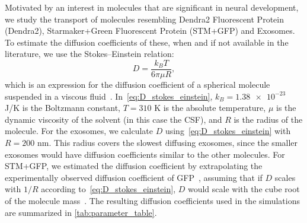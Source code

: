 \documentclass[fleqn]{wlscirep}
\begin{document}
Motivated by an interest in molecules that are significant in neural development, we study the transport of molecules resembling Dendra2 Fluorescent Protein (Dendra2), Starmaker+Green Fluorescent Protein (STM+GFP) and Exosomes. To estimate the diffusion coefficients of these, when and if not available in the literature, we use the Stokes--Einstein relation:
\begin{equation}
    D = \frac{k_B T}{6\pi \mu R} ,
    \label{eq:D_stokes_einstein}
\end{equation}
which is an expression for the diffusion coefficient of a spherical molecule suspended in a viscous fluid~\cite{Einstein1905UberTeilchen}. In~\eqref{eq:D_stokes_einstein}, $k_B = \num{1.38e-23}$ J/K is the Boltzmann constant, $T = 310$ K is the absolute temperature, $\mu$ is the dynamic viscosity of the solvent (in this case the CSF), and $R$ is the radius of the molecule. For the exosomes, we calculate $D$ using~\eqref{eq:D_stokes_einstein} with $R=200$ nm. This radius covers the slowest diffusing exosomes, since the smaller exosomes would have diffusion coefficients similar to the other molecules. For STM+GFP, we estimated the diffusion coefficient by extrapolating the experimentally observed diffusion coefficient of GFP~\cite{Swaminathan1997PhotobleachingDiffusion, Potma2001ReducedCells}, assuming that if $D$ scales with $1/R$ according to~\eqref{eq:D_stokes_einstein}, $D$ would scale with the cube root of the molecule mass~\cite{Goodhill1997DiffusionGuidance}. The resulting diffusion coefficients used in the simulations are summarized in \cref{tab:parameter_table}.


\end{document}
